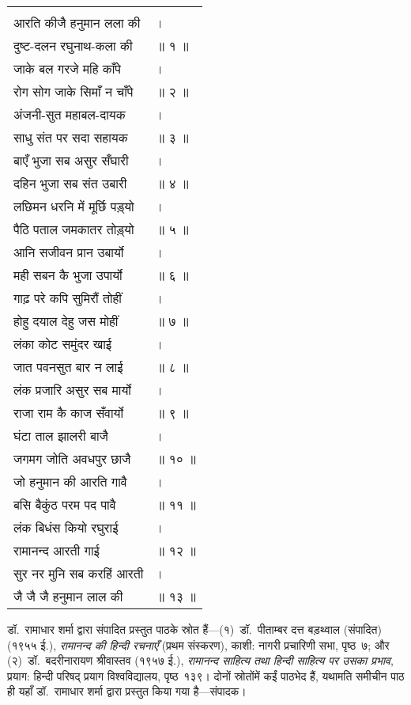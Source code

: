 {\setlength{\mylentwo}{\baselineskip}
\setlength{\mylenone}{\mylenone + 1pt}
\begin{longtable}[l]{@{\hspace*{\mylen}}>{\setlength\parfillskip{0pt}}p{\mylenone}@{}@{}l@{}}
 & \\[-\the\mylentwo]
आरति कीजै हनुमान लला की & ।\\ \nopagebreak
दुष्ट-दलन रघुनाथ-कला की & ॥ १ ॥\\
जाके बल गरजे महि काँपे & ।\\ \nopagebreak
रोग सोग जाके सिमाँ न चाँपे & ॥ २ ॥\\
अंजनी-सुत महाबल-दायक & ।\\ \nopagebreak
साधु संत पर सदा सहायक & ॥ ३ ॥\\
बाएँ भुजा सब असुर सँघारी & ।\\ \nopagebreak
दहिन भुजा सब संत उबारी & ॥ ४ ॥\\
लछिमन धरनि में मूर्छि पड़्यो & ।\\ \nopagebreak
पैठि पताल जमकातर तोड़्यो & ॥ ५ ॥\\
आनि सजीवन प्रान उबार्यो & ।\\ \nopagebreak
मही सबन कै भुजा उपार्यो & ॥ ६ ॥\\
गाढ़ परे कपि सुमिरौं तोहीं & ।\\ \nopagebreak
होहु दयाल देहु जस मोहीं & ॥ ७ ॥\\
लंका कोट समुंदर खाई & ।\\ \nopagebreak
जात पवनसुत बार न लाई & ॥ ८ ॥\\
लंक प्रजारि असुर सब मार्यो & ।\\ \nopagebreak
राजा राम कै काज सँवार्यो & ॥ ९ ॥\\
घंटा ताल झालरी बाजै & ।\\ \nopagebreak
जगमग जोति अवधपुर छाजै & ॥ १० ॥\\
जो हनुमान की आरति गावै & ।\\ \nopagebreak
बसि बैकुंठ परम पद पावै & ॥ ११ ॥\\
लंक बिधंस कियो रघुराई & ।\\ \nopagebreak
रामानन्द आरती गाई & ॥ १२ ॥\\
सुर नर मुनि सब करहिं आरती & ।\\ \nopagebreak
जै जै जै हनुमान लाल की & ॥ १३ ॥\\
\end{longtable}
}
\parasepone
\fontsize{13.5}{17}\selectfont
\begin{sloppypar}\justifying{}
\noindent डॉ.~रामाधार शर्मा द्वारा संपादित प्रस्तुत पाठके स्रोत हैं—(१)~डॉ.~पीताम्बर दत्त बड़थ्वाल (संपादित) (१९५५ ई.), \textit{रामानन्द की हिन्दी रचनाएँ} (प्रथम संस्करण), काशी: नागरी प्रचारिणी सभा,  पृष्ठ~७; और (२)~डॉ.~बदरीनारायण श्रीवास्तव (१९५७ ई.), \textit{रामानन्द साहित्य तथा हिन्दी साहित्य पर उसका प्रभाव}, प्रयाग: हिन्दी परिषद् प्रयाग विश्वविद्यालय, पृष्ठ~१३९। दोनों स्रोतोंमें कईं पाठभेद हैं, यथामति समीचीन पाठ ही यहाँ डॉ.~रामाधार शर्मा द्वारा प्रस्तुत किया गया है—संपादक।
\end{sloppypar}
